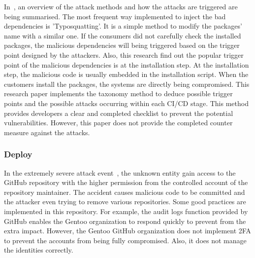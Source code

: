 In~\cite{ohm2020backstabber}, 
an overview of the attack methods and how the attacks are triggered are being summarised. 
The most frequent way implemented to inject the bad dependencies is 'Typosquatting'. It is a simple method
to modify the packages' name with a similar one. If the consumers did not carefully check the installed 
packages, the malicious dependencies will being triggered based on the trigger point designed by the 
attackers. 
Also, this research find out the popular trigger point of the malicious dependencies is at the
installation step. At the installation step, the malicious code is usually embedded in the installation
script. When the customers install the packages, the systems are directly being compromised.  
This research paper implements the taxonomy method to deduce possible trigger points and 
the possible attacks occurring within each CI/CD stage. This method provides developers a clear 
and completed checklist to prevent the potential vulnerabilities. However, this paper does not
provide the completed counter measure against the attacks.

\subsubsection{Deploy}
In the extremely severe attack event~\cite{gentoo-incident-report}, 
the unknown entity gain access to the GitHub repository with the higher permission from the controlled
account of the repository maintainer. The accident causes malicious code to be committed and the
attacker even trying to remove various repositories. Some good practices are implemented
in this repository. For example, the audit logs function provided by GitHub enables the Gentoo organization
to respond quickly to prevent from the extra impact. However, the Gentoo GitHub organization does not
implement 2FA to prevent the accounts from being fully compromised. Also, it does not manage the identities
correctly.

